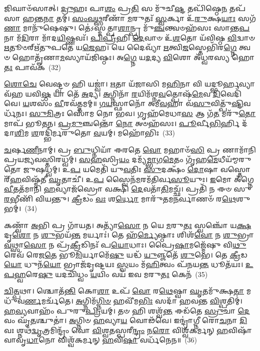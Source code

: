 𑌜𑌿𑌘𑌾𑍞᳴𑌸𑌾𑌤𑍍। \ul{𑌦𑍍𑌰𑍁}\-𑌹𑌃 𑌪𑌾\-\ul{𑌶𑌂} 𑌪𑍍𑌰\-\ul{𑌤𑌿} 𑌸 𑌮𑍁᳴𑌚𑍀\-\ul{𑌷𑍍𑌟} 𑌤𑌪𑌿᳴𑌷𑍍𑌠𑍇\-\ul{𑌨} 𑌤𑌪᳴𑌸𑌾 𑌹𑌨𑍍𑌤\-\ul{𑌨𑌾} 𑌤𑌮𑍍। \ul{𑌸𑌂}\-\-\ul{𑌵}\-\-\ul{𑌥𑍍𑌸}\-𑌰𑍀𑌣𑌾᳴ \ul{𑌮}\-𑌰𑍁𑌤𑌃᳴ \ul{𑌸𑍍𑌵}\-𑌰𑍍𑌕𑌾 𑌉᳴\-\ul{𑌰𑍁}\-𑌕𑍍𑌷\-\ul{𑌯𑌾𑌃} 𑌸𑌗᳴\-\ul{𑌣𑌾} 𑌮𑌾𑌨𑍁᳴𑌷𑍇𑌷𑍁। 𑌤𑍇॑\-𑌽𑌸𑍍𑌮𑌤𑍍𑌪𑌾\-\ul{𑌶𑌾}\-𑌨𑍍𑌪𑍍𑌰 𑌮𑍁᳴\-\ul{𑌞𑍍𑌚}\-𑌨𑍍𑌤𑍍𑌵𑍞𑌹᳴𑌸𑌃 𑌸𑌾𑌨𑍍𑌤\-\ul{𑌪}\-𑌨𑌾 𑌮᳴\-\ul{𑌦𑌿}\-𑌰𑌾 𑌮𑌾᳴𑌦\-\ul{𑌯𑌿}\-𑌷𑍍𑌣𑌵𑌃᳴। \ul{𑌪𑌿}\-\-\ul{𑌪𑍍𑌰𑍀}\-𑌹𑌿 \ul{𑌦𑍇}\-𑌵𑌾𑍞 𑌉᳴\-\ul{𑌶}\-𑌤𑍋 𑌯᳴𑌵𑌿𑌷𑍍𑌠 \ul{𑌵𑌿}\-𑌦𑍍𑌵𑌾𑍞 \ul{𑌋}\-𑌤𑍂𑍞𑌰𑍍\mbox{}𑌋᳴𑌤𑍁𑌪𑌤𑍇 𑌯\-\ul{𑌜𑍇}\-𑌹। 𑌯𑍇 𑌦𑍈𑌵𑍍𑌯𑌾᳴ \ul{𑌋}\-𑌤𑍍𑌵𑌿\-\ul{𑌜}\-𑌸𑍍𑌤𑍇𑌭𑌿᳴𑌰\-\ul{𑌗𑍍𑌨𑍇} 𑌤𑍍𑌵𑍞 𑌹𑍋𑌤𑍄᳴𑌣𑌾\-\ul{𑌮}\-𑌸𑍍𑌯𑌾𑌯᳴𑌜𑌿𑌷𑍍𑌠𑌃। 𑌅\-\ul{𑌗𑍍𑌨𑍇} 𑌯\-\ul{𑌦}\-𑌦𑍍𑌯 \ul{𑌵𑌿}\-𑌶𑍋 𑌅᳴𑌧𑍍𑌵𑌰𑌸𑍍𑌯 𑌹𑍋\-\ul{𑌤𑌃} 𑌪𑌾𑌵᳴𑌕~(32)

\-\ul{𑌶𑍋}\-\-\ul{𑌚𑍇} 𑌵𑍇𑌷𑍍𑌟𑍍𑌵𑍞 𑌹𑌿 𑌯𑌜𑍍𑌵𑌾॑। \ul{𑌋}\-𑌤𑌾 𑌯᳴𑌜𑌾𑌸𑌿 𑌮\-\ul{𑌹𑌿}\-𑌨𑌾 𑌵𑌿 𑌯𑌦𑍍𑌭𑍂𑌰𑍍\mbox{}\-\ul{𑌹}\-𑌵𑍍𑌯𑌾 𑌵᳴𑌹 𑌯𑌵𑌿\-\ul{𑌷𑍍𑌠} 𑌯𑌾 𑌤𑍇᳴ \ul{𑌅}\-𑌦𑍍𑌯। \ul{𑌅}\-𑌗𑍍𑌨𑌿𑌨𑌾᳴ \ul{𑌰}\-𑌯𑌿𑌮᳴𑌶𑍍𑌨\-\ul{𑌵}\-𑌤𑍍𑌪𑍋𑌷᳴\-\ul{𑌮𑍇}\-𑌵 \ul{𑌦𑌿}\-𑌵𑍇𑌦𑌿᳴𑌵𑍇। \ul{𑌯}\-𑌶𑌸𑌂᳴ \ul{𑌵𑍀}\-𑌰𑌵᳴𑌤𑍍𑌤𑌮𑌮𑍍॥ \ul{𑌗}\-\-\ul{𑌯}\-𑌸𑍍𑌫𑌾𑌨𑍋᳴ 𑌅𑌮𑍀\-\ul{𑌵}\-𑌹𑌾 𑌵᳴\-\ul{𑌸𑍁}\-𑌵𑌿𑌤𑍍𑌪𑍁᳴\-\ul{𑌷𑍍𑌟𑌿}\-𑌵𑌰𑍍𑌧᳴𑌨𑌃। \ul{𑌸𑍁}\-\-\ul{𑌮𑌿}\-𑌤𑍍𑌰𑌃 𑌸𑍋᳴𑌮 𑌨𑍋 𑌭𑌵। 𑌗𑍃𑌹᳴𑌮𑍇𑌧𑌾\-\ul{𑌸} 𑌆 𑌗᳴\-\ul{𑌤} 𑌮𑌰𑍁᳴\-\ul{𑌤𑍋} 𑌮𑌾𑌪᳴ 𑌭𑍂𑌤𑌨। \ul{𑌪𑍍𑌰}\-\-\ul{𑌮𑍁}\-𑌞𑍍𑌚𑌨𑍍𑌤𑍋᳴ \ul{𑌨𑍋} 𑌅𑍞𑌹᳴𑌸𑌃। \ul{𑌪𑍂}\-𑌰𑍍𑌵𑍀\-\ul{𑌭𑌿}\-𑌰𑍍\mbox{}𑌹𑌿 𑌦᳴𑌦𑌾\-\ul{𑌶𑌿}\-𑌮 \ul{𑌶}\-𑌰𑌦𑍍𑌭𑌿᳴𑌰𑍍𑌮𑌰𑍁𑌤𑍋 \ul{𑌵}\-𑌯𑌮𑍍। 𑌮𑌹𑍋᳴𑌭𑌿𑌃~(33)

\-\ul{𑌚}\-𑌰𑍍\mbox{}\-\ul{𑌷}\-\-\ul{𑌣𑍀}\-𑌨𑌾𑌮𑍍। 𑌪𑍍𑌰 \ul{𑌬𑍁}\-𑌧𑍍𑌨𑌿𑌯𑌾᳴ 𑌈𑌰𑌤𑍇 \ul{𑌵𑍋} 𑌮𑌹𑌾𑍞᳴\-\ul{𑌸𑌿} 𑌪𑍍𑌰 𑌣𑌾𑌮𑌾᳴𑌨𑌿 𑌪𑍍𑌰𑌯𑌜𑍍𑌯𑌵𑌸𑍍𑌤𑌿𑌰𑌧𑍍𑌵𑌮𑍍। \ul{𑌸}\-\-\ul{𑌹}\-𑌸𑍍𑌰𑌿\-\ul{𑌯𑌂} 𑌦𑌮𑍍𑌯᳴\-\ul{𑌮𑍍𑌭𑌾}\-𑌗\-\ul{𑌮𑍇}\-𑌤𑌂 𑌗𑍃᳴𑌹\-\ul{𑌮𑍇}\-𑌧𑍀𑌯᳴𑌮𑍍𑌮𑌰𑍁𑌤𑍋 𑌜𑍁𑌷𑌧𑍍𑌵𑌮𑍍। 𑌉\-\ul{𑌪} 𑌯𑌮𑍇𑌤𑌿᳴ 𑌯𑍁\-\ul{𑌵}\-𑌤𑌿𑌃 \ul{𑌸𑍁}\-𑌦𑌕𑍍𑌷𑌂᳴ \ul{𑌦𑍋}\-𑌷𑌾 𑌵𑌸𑍍𑌤𑍋𑌰𑍍\mbox{}᳴\-\ul{𑌹}\-𑌵𑌿𑌷𑍍𑌮᳴𑌤𑍀 \ul{𑌘𑍃}\-𑌤𑌾𑌚𑍀॑। 𑌉\-\ul{𑌪} 𑌸𑍍𑌵𑍈𑌨᳴\-\ul{𑌮}\-𑌰𑌮᳴𑌤𑌿𑌰𑍍𑌵\-\ul{𑌸𑍂}\-𑌯𑍁𑌃। \ul{𑌇}\-𑌮𑍋 𑌅᳴𑌗𑍍𑌨𑍇 \ul{𑌵𑍀}\-𑌤𑌤᳴𑌮𑌾𑌨𑌿 \ul{𑌹}\-𑌵𑍍𑌯𑌾𑌜᳴𑌸𑍍𑌰𑍋 𑌵𑌕𑍍𑌷𑌿 \ul{𑌦𑍇}\-𑌵𑌤𑌾᳴\-\ul{𑌤𑌿}\-𑌮𑌚𑍍𑌛᳴। 𑌪𑍍𑌰𑌤𑌿᳴ 𑌨 𑌈𑍞 𑌸𑍁\-\ul{𑌰}\-𑌭𑍀𑌣𑌿᳴ 𑌵𑌿𑌯𑌨𑍍𑌤𑍁। \ul{𑌕𑍍𑌰𑍀}\-𑌡𑌂 \ul{𑌵𑌃} 𑌶\-\ul{𑌰𑍍𑌧𑍋} 𑌮𑌾𑌰𑍁᳴𑌤𑌮\-\ul{𑌨}\-𑌰𑍍𑌵𑌾𑌣𑍞᳴ 𑌰\-\ul{𑌥𑍇}\-𑌶𑍁𑌭𑌮𑍍॑।~(34)

𑌕𑌣𑍍𑌵𑌾᳴ \ul{𑌅}\-𑌭𑌿 𑌪𑍍𑌰 𑌗𑌾᳴𑌯𑌤। 𑌅𑌤𑍍𑌯𑌾᳴\-\ul{𑌸𑍋} 𑌨 𑌯𑍇 \ul{𑌮}\-𑌰𑍁\-\ul{𑌤𑌃} 𑌸𑍍𑌵𑌞𑍍𑌚𑍋᳴ 𑌯\-\ul{𑌕𑍍𑌷}\-𑌦𑍃\-\ul{𑌶𑍋} 𑌨 \ul{𑌶𑍁}\-𑌭𑌯᳴\-\ul{𑌨𑍍𑌤} 𑌮𑌰𑍍𑌯𑌾𑌃॑। 𑌤𑍇 𑌹᳴\-\ul{𑌰𑍍𑌮𑍍𑌯𑍇}\-𑌷𑍍𑌠𑌾𑌃 𑌶𑌿𑌶᳴\-\ul{𑌵𑍋} 𑌨 \ul{𑌶𑍁}\-𑌭𑍍𑌰𑌾 \ul{𑌵}\-𑌥𑍍𑌸𑌾\-\ul{𑌸𑍋} 𑌨 𑌪𑍍𑌰᳴\-\ul{𑌕𑍍𑌰𑍀}\-𑌡𑌿𑌨𑌃᳴ 𑌪\-\ul{𑌯𑍋}\-𑌧𑌾𑌃। 𑌪𑍍𑌰𑍈\-\ul{𑌷𑌾}\-𑌮𑌜𑍍𑌮𑍇᳴𑌷𑍁 𑌵𑌿\-\ul{𑌥𑍁}\-𑌰𑍇𑌵᳴ 𑌰𑍇𑌜\-\ul{𑌤𑍇} 𑌭𑍂\-\ul{𑌮𑌿}\-𑌰𑍍𑌯𑌾𑌮𑍇᳴\-\ul{𑌷𑍁} 𑌯𑌦𑍍𑌧᳴ \ul{𑌯𑍁}\-𑌞𑍍𑌜𑌤𑍇᳴ \ul{𑌶𑍁}\-𑌭𑍇। 𑌤𑍇 \ul{𑌕𑍍𑌰𑍀}\-𑌡\-\ul{𑌯𑍋} 𑌧𑍁𑌨᳴\-\ul{𑌯𑍋} 𑌭𑍍𑌰𑌾𑌜᳴𑌦𑍃𑌷𑍍𑌟𑌯𑌃 \ul{𑌸𑍍𑌵}\-𑌯𑌂 𑌮᳴\-\ul{𑌹𑌿}\-𑌤𑍍𑌵𑌂 𑌪᳴𑌨𑌯\-\ul{𑌨𑍍𑌤} 𑌧𑍂𑌤᳴𑌯𑌃। \ul{𑌉}\-\-\ul{𑌪}\-\-\ul{𑌹𑍍𑌵}\-𑌰𑍇\-\ul{𑌷𑍁} 𑌯𑌦𑌚𑌿᳴𑌧𑍍𑌵𑌂 \ul{𑌯}\-𑌯𑌿𑌂 𑌵𑌯᳴ 𑌇𑌵 𑌮𑌰𑍁\-\ul{𑌤𑌃} 𑌕𑍇𑌨᳴~(35)

\-\ul{𑌚𑌿}\-\-\ul{𑌤𑍍𑌪}\-𑌥𑌾। 𑌶𑍍𑌚𑍋𑌤᳴\-\ul{𑌨𑍍𑌤𑌿} 𑌕𑍋\-\ul{𑌶𑌾} 𑌉𑌪᳴ \ul{𑌵𑍋} 𑌰\-\ul{𑌥𑍇}\-𑌷𑍍𑌵𑌾 \ul{𑌘𑍃}\-𑌤𑌮𑍁᳴𑌕𑍍𑌷\-\ul{𑌤𑌾} 𑌮𑌧𑍁᳴𑌵\-\ul{𑌰𑍍𑌣}\-𑌮𑌰𑍍𑌚᳴𑌤𑍇। \ul{𑌅}\-𑌗𑍍𑌨𑌿𑌮᳴\-\ul{𑌗𑍍𑌨𑌿}\-\-\ul{𑍞} 𑌹𑌵𑍀᳴𑌮\-\ul{𑌭𑌿𑌃} 𑌸𑌦𑌾᳴ 𑌹𑌵𑌨𑍍𑌤 \ul{𑌵𑌿}\-𑌶𑍍𑌪𑌤𑌿𑌮𑍍॑। \ul{𑌹}\-\-\ul{𑌵𑍍𑌯}\-𑌵𑌾𑌹𑌂᳴ 𑌪𑍁𑌰𑍁\-\ul{𑌪𑍍𑌰𑌿}\-𑌯𑌮𑍍। 𑌤𑍞 𑌹𑌿 𑌶𑌶𑍍𑌵᳴\-\ul{𑌨𑍍𑌤} 𑌈𑌡᳴𑌤𑍇 \ul{𑌸𑍍𑌰𑍁}\-𑌚𑌾 \ul{𑌦𑍇}\-𑌵𑌂 𑌘𑍃᳴\-\ul{𑌤}\-𑌶𑍍𑌚𑍁𑌤𑌾॑। \ul{𑌅}\-𑌗𑍍𑌨𑌿𑍞 \ul{𑌹}\-𑌵𑍍𑌯𑌾\-\ul{𑌯} 𑌵𑍋𑌢᳴𑌵𑍇। 𑌇𑌨𑍍𑌦𑍍𑌰𑌾॑𑌗𑍍𑌨𑍀 𑌰𑍋\-\ul{𑌚}\-𑌨𑌾 \ul{𑌦𑌿}\-𑌵𑌃 𑌶𑍍𑌨𑌥᳴\-\ul{𑌦𑍍𑌵𑍃}\-𑌤𑍍𑌰𑌮𑌿𑌨𑍍𑌦𑍍𑌰𑌂᳴ 𑌵𑍋 \ul{𑌵𑌿}\-𑌶𑍍𑌵\-\ul{𑌤}\-𑌸𑍍𑌪𑌰𑍀\-\ul{𑌨𑍍𑌦𑍍𑌰𑌂} 𑌨\-\ul{𑌰𑍋} 𑌵𑌿𑌶𑍍𑌵᳴𑌕𑌰𑍍𑌮𑌨𑍍 \ul{𑌹}\-𑌵𑌿𑌷𑌾᳴ 𑌵𑌾𑌵𑍃\-\ul{𑌧𑌾}\-𑌨𑍋 𑌵𑌿𑌶𑍍𑌵᳴𑌕𑌰𑍍𑌮𑌨𑍍 \ul{𑌹}\-𑌵𑌿\-\ul{𑌷𑌾} 𑌵𑌰𑍍𑌧᳴𑌨𑍇𑌨॥~(36)

